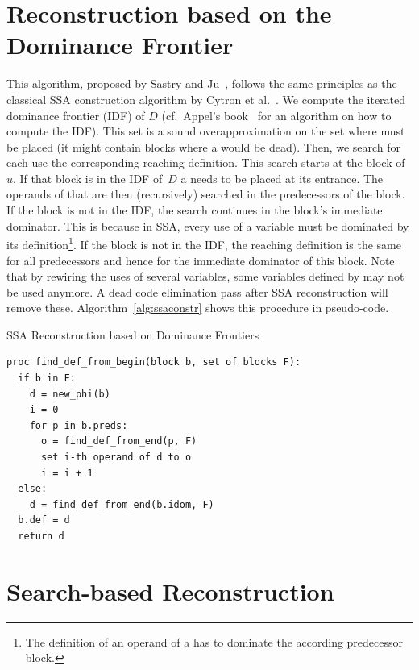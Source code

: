 \section{Reconstruction based on the Dominance Frontier}
This algorithm, proposed by Sastry and Ju~\cite{sastry98}, follows the same principles as the classical SSA construction algorithm by Cytron et al.~\cite{cytron:1991:ssa}.
We compute the iterated dominance frontier (IDF) of $D$ (cf.~Appel's book~\cite{appel:2002:modern} for an algorithm on how to compute the IDF).
This set is a sound overapproximation on the set where \phifuns must be placed (it might contain blocks where a \phifun would be dead).
Then, we search for each use the corresponding reaching definition.
This search starts at the block of~$u$.
If that block is in the IDF of~$D$ a \phifun needs to be placed at its entrance.
The operands of that \phifun are then (recursively) searched in the predecessors of the block.
If the block is not in the IDF, the search continues in the block's immediate dominator. 
This is because in SSA, every use of a variable must be dominated by its definition\footnote{The definition of an operand of a \phifun has to dominate the according predecessor block.}.
If the block is not in the IDF, the reaching definition is the same for all predecessors and hence for the immediate dominator of this block.
Note that by rewiring the uses of several variables, some variables defined by \phifuns may not be used anymore.
A dead code elimination pass after SSA reconstruction will remove these. 
Algorithm~\ref{alg:ssaconstr} shows this procedure in pseudo-code.

\begin{algorithm}
  \caption{SSA Reconstruction based on Dominance Frontiers}
  \label{alg:ssaconstr}
\begin{verbatim}
proc find_def_from_begin(block b, set of blocks F):
  if b in F:
    d = new_phi(b)
    i = 0
    for p in b.preds: 
      o = find_def_from_end(p, F)
      set i-th operand of d to o
      i = i + 1
  else:
    d = find_def_from_end(b.idom, F)
  b.def = d
  return d
\end{verbatim}
\end{algorithm}

\section{Search-based Reconstruction}

